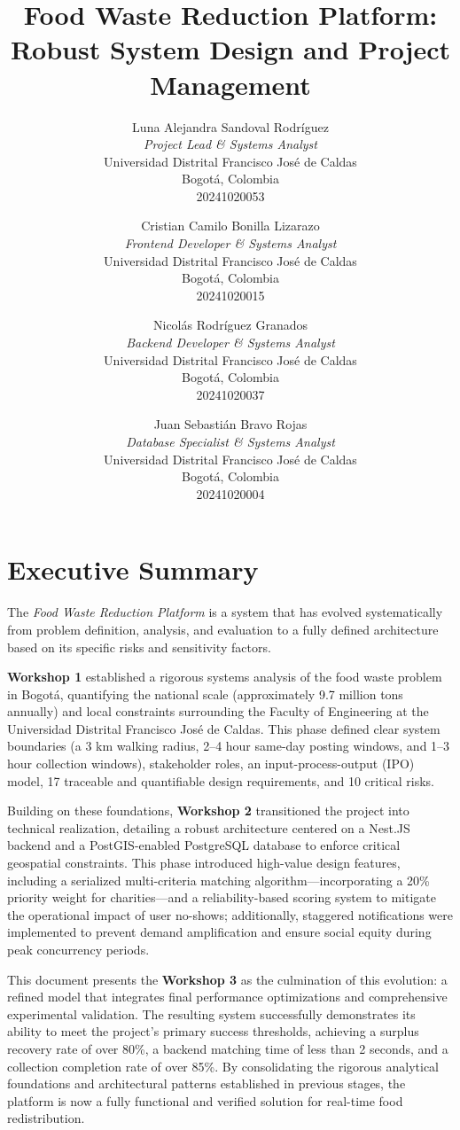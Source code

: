 \documentclass[9pt,conference]{IEEEtran}
\title{Food Waste Reduction Platform: Robust System Design and Project Management}
\author{
Luna Alejandra Sandoval Rodríguez \\
\textit{Project Lead \& Systems Analyst} \\
Universidad Distrital Francisco José de Caldas \\
Bogotá, Colombia \\
20241020053
\and
Cristian Camilo Bonilla Lizarazo \\
\textit{Frontend Developer \& Systems Analyst} \\
Universidad Distrital Francisco José de Caldas \\
Bogotá, Colombia \\
20241020015
\and
Nicolás Rodríguez Granados \\
\textit{Backend Developer \& Systems Analyst} \\
Universidad Distrital Francisco José de Caldas \\
Bogotá, Colombia \\
20241020037
\and
Juan Sebastián Bravo Rojas \\
\textit{Database Specialist \& Systems Analyst} \\
Universidad Distrital Francisco José de Caldas \\
Bogotá, Colombia \\
20241020004
}
\begin{document}
\maketitle

\section{Executive Summary}
The \textit{Food Waste Reduction Platform} is a system that has evolved systematically from problem definition, analysis, and evaluation to a fully defined architecture based on its specific risks and sensitivity factors. 

\textbf{Workshop 1 } established a rigorous systems analysis of the food waste problem in Bogotá, quantifying the national scale (approximately 9.7 million tons annually) and local constraints surrounding the Faculty of Engineering at the Universidad Distrital Francisco José de Caldas. This phase defined clear system boundaries (a 3 km walking radius, 2–4 hour same-day posting windows, and 1–3 hour collection windows), stakeholder roles, an input-process-output (IPO) model, 17 traceable and quantifiable design requirements, and 10 critical risks.

Building on these foundations, \textbf{Workshop 2} transitioned the project into technical realization, detailing a robust architecture centered on a Nest.JS backend and a PostGIS-enabled PostgreSQL database to enforce critical geospatial constraints. This phase introduced high-value design features, including a serialized multi-criteria matching algorithm—incorporating a 20\% priority weight for charities—and a reliability-based scoring system to mitigate the operational impact of user no-shows; additionally, staggered notifications were implemented to prevent demand amplification and ensure social equity during peak concurrency periods.

This document presents the \textbf{Workshop 3} as the culmination of this evolution: a refined model that integrates final performance optimizations and comprehensive experimental validation. The resulting system successfully demonstrates its ability to meet the project's primary success thresholds, achieving a surplus recovery rate of over 80\%, a backend matching time of less than 2 seconds, and a collection completion rate of over 85\%. By consolidating the rigorous analytical foundations and architectural patterns established in previous stages, the platform is now a fully functional and verified solution for real-time food redistribution.
\end{document}
